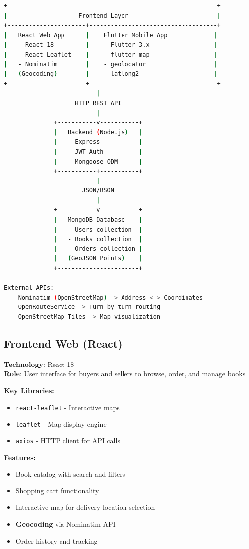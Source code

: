 \documentclass[12pt,a4paper]{article}
\begin{document}
\begin{lstlisting}[language=bash, caption={System Architecture}]
+-----------------------------------------------------------+
|                    Frontend Layer                         |
+----------------------+------------------------------------+
|   React Web App      |    Flutter Mobile App             |
|   - React 18         |    - Flutter 3.x                  |
|   - React-Leaflet    |    - flutter_map                  |
|   - Nominatim        |    - geolocator                   |
|   (Geocoding)        |    - latlong2                     |
+----------------------+------------------------------------+
                          |
                    HTTP REST API
                          |
              +-----------v-----------+
              |   Backend (Node.js)   |
              |   - Express           |
              |   - JWT Auth          |
              |   - Mongoose ODM      |
              +-----------+-----------+
                          |
                      JSON/BSON
                          |
              +-----------v-----------+
              |   MongoDB Database    |
              |   - Users collection  |
              |   - Books collection  |
              |   - Orders collection |
              |   (GeoJSON Points)    |
              +-----------------------+

External APIs:
  - Nominatim (OpenStreetMap) -> Address <-> Coordinates
  - OpenRouteService -> Turn-by-turn routing
  - OpenStreetMap Tiles -> Map visualization
\end{lstlisting}

\subsection{Frontend Web (React)}

\textbf{Technology}: React 18\\
\textbf{Role}: User interface for buyers and sellers to browse, order, and manage books

\textbf{Key Libraries:}
\begin{itemize}
    \item \texttt{react-leaflet} - Interactive maps
    \item \texttt{leaflet} - Map display engine
    \item \texttt{axios} - HTTP client for API calls
\end{itemize}

\textbf{Features:}
\begin{itemize}
    \item Book catalog with search and filters
    \item Shopping cart functionality
    \item Interactive map for delivery location selection
    \item \textbf{Geocoding} via Nominatim API
    \item Order history and tracking
\end{itemize}
\end{document}
